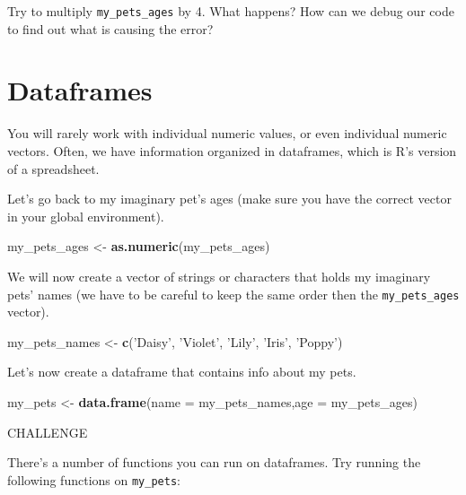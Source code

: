 \documentclass[]{book}
\newenvironment{Shaded}{\begin{snugshade}}{\end{snugshade}}
\newcommand{\DataTypeTok}[1]{\textcolor[rgb]{0.13,0.29,0.53}{#1}}
\newcommand{\KeywordTok}[1]{\textcolor[rgb]{0.13,0.29,0.53}{\textbf{#1}}}
\newcommand{\NormalTok}[1]{#1}
\newcommand{\StringTok}[1]{\textcolor[rgb]{0.31,0.60,0.02}{#1}}
\begin{document}
Try to multiply \texttt{my\_pets\_ages} by 4. What happens? How can we debug our code to find out what is causing the error?

\hypertarget{dataframes}{%
\section{Dataframes}\label{dataframes}}

You will rarely work with individual numeric values, or even individual numeric vectors. Often, we have information organized in dataframes, which is R's version of a spreadsheet.

Let's go back to my imaginary pet's ages (make sure you have the correct vector in your global environment).

\begin{Shaded}
\begin{Highlighting}[]
\NormalTok{my_pets_ages <-}\StringTok{ }\KeywordTok{as.numeric}\NormalTok{(my_pets_ages)}
\end{Highlighting}
\end{Shaded}

We will now create a vector of strings or characters that holds my imaginary pets' names (we have to be careful to keep the same order then the \texttt{my\_pets\_ages} vector).

\begin{Shaded}
\begin{Highlighting}[]
\NormalTok{my_pets_names <-}\StringTok{ }\KeywordTok{c}\NormalTok{(}\StringTok{'Daisy'}\NormalTok{, }\StringTok{'Violet'}\NormalTok{, }\StringTok{'Lily'}\NormalTok{, }\StringTok{'Iris'}\NormalTok{, }\StringTok{'Poppy'}\NormalTok{)}
\end{Highlighting}
\end{Shaded}

Let's now create a dataframe that contains info about my pets.

\begin{Shaded}
\begin{Highlighting}[]
\NormalTok{my_pets <-}\StringTok{ }\KeywordTok{data.frame}\NormalTok{(}\DataTypeTok{name =}\NormalTok{ my_pets_names,}\DataTypeTok{age =}\NormalTok{ my_pets_ages)}
\end{Highlighting}
\end{Shaded}

\leavevmode\hypertarget{challenge}{}%
CHALLENGE

There's a number of functions you can run on dataframes. Try running the following functions on \texttt{my\_pets}:
\end{document}
